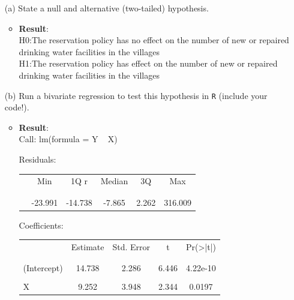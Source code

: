 \documentclass[12pt,letterpaper]{article}
\begin{document}
\newpage
\begin{enumerate}
	\item [(a)] State a null and alternative (two-tailed) hypothesis. 
	\begin{itemize}
		\item \textbf{Result}:\\
	H0:The reservation policy has no effect on the number of new or repaired drinking water facilities in the villages\\
	H1:The reservation policy has effect on the number of new or repaired drinking water facilities in the villages
	\end{itemize}
	\vspace{1cm}
	\item [(b)] Run a bivariate regression to test this hypothesis in \texttt{R} (include your code!).
		
	\begin{itemize}
		\item \textbf{Result}:\\
		Call:
		lm(formula = Y ~ X)
		
		Residuals:
		           
		   
			\begin{table}[h]
			\centering
			\begin{tabular}{l | c c c c c}
				& Min   & 1Q  r &Median   & 3Q  &Max   \\
				\\[-1.8ex] 
				\hline \\[-1.8ex]
				  & -23.991&-14.738  &  -7.865   &2.262 &316.009 \\
				                                 
			\end{tabular}
		\end{table}
		Coefficients: 
			\begin{table}[h]
			\centering
			\begin{tabular}{l | c c c c }
				& Estimate & Std. Error & t &  Pr(>|t|) \\
				\\[-1.8ex] 
				\hline \\[-1.8ex]
			(Intercept)  & 14.738 & 2.286  &  6.446 &4.22e-10  \\
				\\
				X  &9.252 & 3.948  & 2.344 & 0.0197\\
				
			\end{tabular}
		\end{table}


\end{itemize}
\end{enumerate}
\end{document}
